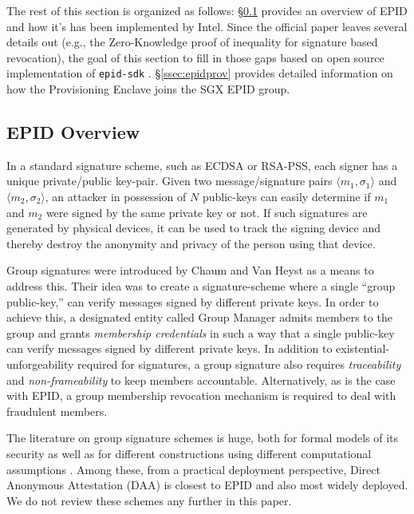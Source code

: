 \documentclass[letterpaper]{article}
\newcommand{\secref}[1]{\S\ref{#1}}
\begin{document}
  The rest of this section is organized as follows: \secref{ssec:epid}
  provides an overview of EPID and how it's has been implemented by
  Intel. Since the official \cite{epid} paper leaves several details
  out (e.g., the Zero-Knowledge proof of inequality for signature
  based revocation), the goal of this section to fill in those gaps
  based on open source implementation of \texttt{epid-sdk}
  \cite{epidsdk}. \secref{ssec:epidprov} provides detailed information
  on how the \textsf{Provisioning Enclave} joins the SGX EPID
  group.

  \subsection{EPID Overview}
  \label{ssec:epid}
  In a standard signature scheme, such as ECDSA or RSA-PSS, each
  signer has a unique private/public key-pair. Given two
  message/signature pairs $\langle m_1, \sigma_1 \rangle$ and $\langle
  m_2, \sigma_2 \rangle$, an attacker in possession of $N$ public-keys
  can easily determine if $m_1$ and $m_2$ were signed by the same
  private key or not. If such signatures are generated by physical
  devices, it can be used to track the signing device and thereby
  destroy the anonymity and privacy of the person using that device.

  Group signatures were introduced by Chaum and Van Heyst
  \cite{ChaumGroupSignatures} as a means to address this. Their idea
  was to create a signature-scheme where a single ``group
  public-key,'' can verify messages signed by different private
  keys. In order to achieve this, a designated entity called Group
  Manager admits members to the group and grants \textit{membership
    credentials} in such a way that a single public-key can verify
  messages signed by different private keys. In addition to
  existential-unforgeability required for signatures, a group
  signature also requires \textit{traceability} and
  \textit{non-frameability} to keep members
  accountable. Alternatively, as is the case with EPID, a group
  membership revocation mechanism is required to deal with fraudulent
  members.

  The literature on group signature schemes is huge, both for formal
  models of its security as well as for different constructions using
  different computational assumptions
  \cite{BMW03,dynamicGroupSignatures, fulldynamicgroupsignature, bbs,
    Furukawa2005, coalitionresistant, camenischLysyankaya}. Among
  these, from a practical deployment perspective, Direct Anonymous
  Attestation \cite{daa, ucdaa} (DAA) is closest to EPID and also most
  widely deployed. We do not review these schemes any further in this
  paper.
\end{document}
